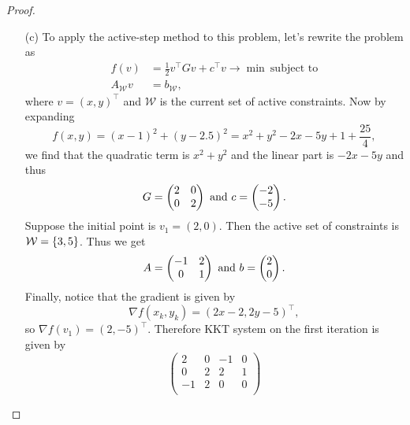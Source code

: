 \documentclass[12pt]{report}
\begin{document}
\begin{problem}
\begin{proof}
\begin{enumerate}
    
    \item [(c)]
    To apply the active-step method to this problem, let's rewrite the problem as
    \begin{align*}
        f(v) &= \frac{1}{2} v^\top G v + c^\top v \to \min ~\text{subject to}\\
        A_\mathcal{W} v &= b_\mathcal{W}, 
    \end{align*}
    where $v = (x,y)^\top$ and $\mathcal{W}$ is the current set of active constraints. Now by expanding 
    \begin{equation*}
        f(x,y) = (x - 1)^2 + (y - 2.5)^2 =  x^2 + y^2 - 2x - 5y + 1+ \frac{25}{4},
    \end{equation*}
    we find that the quadratic term is $x^2 + y^2$ and the linear part is $-2x - 5y$ and thus 
    \begin{equation*}
        G = \begin{pmatrix}
            2 & 0 \\ 0 & 2
        \end{pmatrix} {~\text{and}~} c = \begin{pmatrix}
            -2 \\ -5
        \end{pmatrix}.
    \end{equation*}
    Suppose the initial point is $v_1 = (2,0)$. Then the active set of constraints is $\mathcal{W} = {\left\{3,5\right\}}$. Thus we get
    \begin{equation*}
        A = \begin{pmatrix}
            -1 & 2 \\ 0 & 1
        \end{pmatrix} {~\text{and}~} b =\begin{pmatrix}
            2 \\ 0
        \end{pmatrix}.
    \end{equation*}
    Finally, notice that the gradient is given by
    \begin{equation*}
        \nabla f(x_k,y_k) = (2x-2,2y-5)^\top,
    \end{equation*}
    so $\nabla f(v_1) = (2,-5)^\top$. Therefore KKT system on the first iteration is given by
    \begin{equation*}
        \begin{pmatrix}
            2 & 0 & -1 & 0\\
            0 & 2 & 2 & 1\\
            -1 & 2 & 0 & 0\\

\end{pmatrix}
\end{equation*}
\end{enumerate}
\end{proof}
\end{problem}
\end{document}
